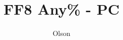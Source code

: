 \documentclass[dvipsnames]{report}
\title{FF8 Any\% - PC}
\author{Olson}
\begin{document}
\singlespacing

\begin{multicols*}{2}





\end{multicols*}
\end{document}
